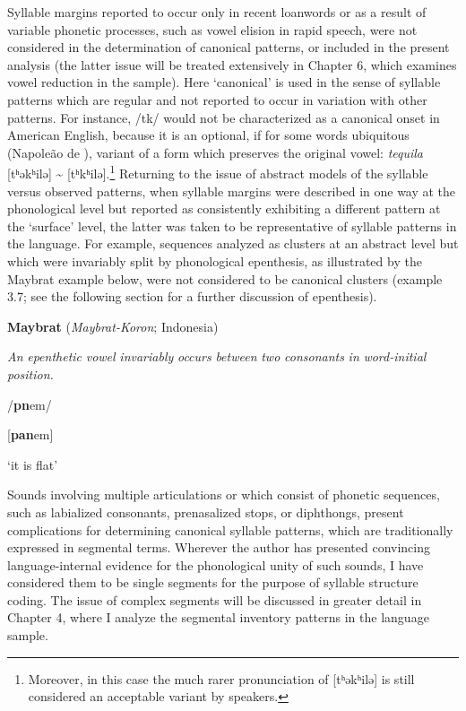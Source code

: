   Syllable margins reported to occur only in recent loanwords or as a result of variable phonetic processes, such as vowel elision in rapid speech, were not considered in the determination of canonical patterns, or included in the present analysis (the latter issue will be treated extensively in Chapter 6, which examines vowel reduction in the sample). Here ‘canonical’ is used in the sense of syllable patterns which are regular and not reported to occur in variation with other patterns. For instance, /tk/ would not be characterized as a canonical onset in American English, because it is an optional, if for some words ubiquitous (Napoleão de \citealt{Souza2019}), variant of a form which preserves the original vowel: \textit{tequila} [tʰəkʰilə] {\textasciitilde} [tʰkʰilə].\footnote{ \textrm{Moreover, in this case the much rarer pronunciation of [tʰəkʰilə] is still considered an acceptable variant by speakers.}} Returning to the issue of abstract models of the syllable versus observed patterns, when syllable margins were described in one way at the phonological level but reported as consistently exhibiting a different pattern at the ‘surface’ level, the latter was taken to be representative of syllable patterns in the language. For example, sequences analyzed as clusters at an abstract level but which were invariably split by phonological epenthesis, as illustrated by the Maybrat example below, were not considered to be canonical clusters (example 3.7; see the following section for a further discussion of epenthesis).



\ea\label{ex:(3.7)}
   \textbf{Maybrat} (\textit{Maybrat-Koron}; Indonesia)



\textit{An} \textit{epenthetic} \textit{vowel} \textit{invariably} \textit{occurs} \textit{between} \textit{two} \textit{consonants} \textit{in} \textit{word-initial} \textit{position.}



/\textbf{pn}em/



[\textbf{pan}em]



‘it is flat’



\citep[35-6]{Dol2007}

\z


  Sounds involving multiple articulations or which consist of phonetic sequences, such as labialized consonants, prenasalized stops, or diphthongs, present complications for determining canonical syllable patterns, which are traditionally expressed in segmental terms. Wherever the author has presented convincing language-internal evidence for the phonological unity of such sounds, I have considered them to be single segments for the purpose of syllable structure coding. The issue of complex segments will be discussed in greater detail in Chapter 4, where I analyze the segmental inventory patterns in the language sample.



